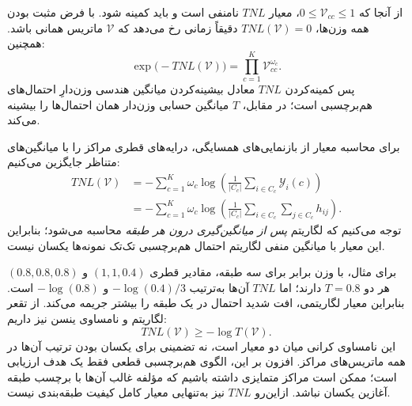 از آنجا که $0\le\mathcal V_{cc}\le1$، معیار $TNL$ نامنفی است و باید کمینه شود. با فرض مثبت بودن همه وزن‌ها، $TNL(\mathcal V)=0$ دقیقاً زمانی رخ می‌دهد که $\mathcal V$ ماتریس همانی باشد. همچنین:
\begin{equation}\label{eq:ch3-TNL-geometric-mean}
\boxed{\exp\!\bigl(-TNL(\mathcal V)\bigr)
=\prod_{c=1}^{K}\mathcal V_{cc}^{\omega_c}.}
\end{equation}
پس کمینه‌کردن $TNL$ معادل بیشینه‌کردن میانگین هندسی وزن‌دارِ احتمال‌های هم‌برچسبی است؛ در مقابل، $T$ میانگین حسابی وزن‌دار همان احتمال‌ها را بیشینه می‌کند.

برای محاسبه معیار از بازنمایی‌های همسایگی، درایه‌های قطری مراکز را با میانگین‌های متناظر جایگزین می‌کنیم:
\begin{equation}\label{eq:ch3-TNL-on-Y-H}
\begin{aligned}
TNL(\mathcal V)
&=-\sum_{c=1}^{K}\omega_c\log
\left(\frac{1}{|C_c|}
\sum_{i\in C_c}\mathscr Y_i(c)\right)\\
&=-\sum_{c=1}^{K}\omega_c\log
\left(\frac{1}{|C_c|}
\sum_{i\in C_c}\sum_{j\in C_c}h_{ij}\right).
\end{aligned}
\end{equation}
توجه می‌کنیم که لگاریتم \emph{پس از میانگین‌گیری درون هر طبقه} محاسبه می‌شود؛ بنابراین این معیار با میانگین منفی لگاریتم احتمال هم‌برچسبی تک‌تک نمونه‌ها یکسان نیست.

برای مثال، با وزن برابر برای سه طبقه، مقادیر قطری $(1,1,0.4)$ و $(0.8,0.8,0.8)$ هر دو $T=0.8$ دارند؛ اما $TNL$ آن‌ها به‌ترتیب $-\log(0.4)/3$ و $-\log(0.8)$ است. بنابراین معیار لگاریتمی، افت شدید احتمال در یک طبقه را بیشتر جریمه می‌کند. از تقعر لگاریتم و نامساوی ینسن نیز داریم:
\begin{equation}\label{eq:ch3-TNL-Jensen}
\boxed{TNL(\mathcal V)\ge-\log T(\mathcal V).}
\end{equation}
این نامساوی کرانی میان دو معیار است، نه تضمینی برای یکسان بودن ترتیب آن‌ها در همه ماتریس‌های مراکز. افزون بر این، الگوی هم‌برچسبی قطعی فقط یک هدف ارزیابی است؛ ممکن است مراکز متمایزی داشته باشیم که مؤلفه غالب آن‌ها با برچسب طبقه آغازین یکسان نباشد. ازاین‌رو $TNL$ نیز به‌تنهایی معیار کامل کیفیت طبقه‌بندی نیست.

